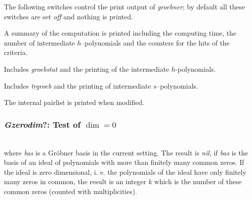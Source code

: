 The following switches control the print output of \emph{groebner}; by
default all these switches are set \emph{off} and nothing is printed.
\begin{description}
\item[\emph{groebstat} --]
\hypertarget{switch:GROEBSTAT}{}
  A summary of the computation is printed
including the computing time, the number of intermediate
$h$--polynomials and the counters for the hits of the criteria.

\item[\emph{trgroeb} --]
  \hypertarget{switch:TRGROEB}{}
  Includes \emph{groebstat} and the printing of the
intermediate $h$-polynomials.

\item[\emph{trgroebs} --]
    \hypertarget{switch:TRGROEBS}{}
Includes \emph{trgroeb} and the printing of
intermediate $s$--poly\-nomials.

\item[\emph{trgroeb1} --]
    \hypertarget{switch:TRGROEB1}{}
The internal pairlist is printed when modified.
\end{description}

\subsubsection{\emph{Gzerodim}?: Test of $\dim = 0$}
\begin{description}
\item[{\it gzerodim}!? \emph{bas}]\mbox{}\\
  \hypertarget{operator:GZERODIM!?}{}
where {\it bas} is a Gr\"obner basis in the current setting.
The result is {\it nil}, if {\it bas} is the
basis of an ideal of polynomials with more than finitely many common zeros.
If the ideal is zero dimensional, i. e. the polynomials of the ideal have only
finitely many zeros in common, the result is an integer $k$ which is the number
of these common zeros (counted with multiplicities).
\end{description}

